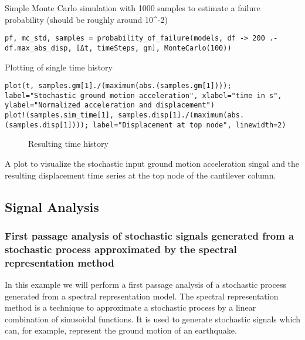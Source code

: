 Simple Monte Carlo simulation with 1000 samples to estimate a failure probability (should be roughly around 10{\textasciicircum}-2)




\begin{verbatim}
pf, mc_std, samples = probability_of_failure(models, df -> 200 .- df.max_abs_disp, [Δt, timeSteps, gm], MonteCarlo(100))
\end{verbatim}



Plotting of single time history




\begin{verbatim}
plot(t, samples.gm[1]./(maximum(abs.(samples.gm[1]))); label="Stochastic ground motion acceleration", xlabel="time in s", ylabel="Normalized acceleration and displacement")
plot!(samples.sim_time[1], samples.disp[1]./(maximum(abs.(samples.disp[1]))); label="Displacement at top node", linewidth=2)
\end{verbatim}



\begin{figure}
\centering
\caption{Resulting time history}
\end{figure}
 A plot to visualize the stochastic input ground motion acceleration singal and the resulting displacement time series at the top node of the cantilever column.



\subsection{Signal Analysis}



\label{2703783626997087689}{}


\subsubsection{First passage analysis of stochastic signals generated from a stochastic process approximated by the spectral representation method}



\label{6920089283529822742}{}


In this example we will perform a first passage analysis of a stochastic process generated from a spectral representation model. The spectral representation method is a technique to approximate a stochastic process by a linear combination of sinusoidal functions. It is used to generate stochastic signals which can, for example, represent the ground motion of an earthquake.



